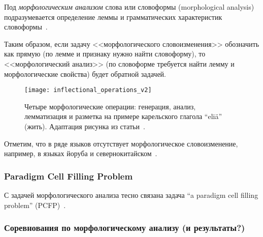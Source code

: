 Под \emph{морфологическим анализом} слова или словоформы (morphological analysis)
подразумевается определение леммы и
грамматических характеристик словоформы~\cite{MitreninaNikolaevLando2016}.

Таким образом, если задачу <<морфологического словоизменения>> обозначить как прямую
(по лемме и признаку нужно найти словоформу),
то <<морфологический анализ>> (по словоформе требуется найти
лемму и морфологические свойства) будет обратной задачей.

\begin{figure}
    \centering
    \texttt{[image: inflectional\_operations\_v2]}
\caption[Четыре морфологические операции: генерация, анализ, лемматизация и разметка]{Четыре морфологические операции: генерация, анализ, лемматизация и разметка 
		   на примере карельского глагола ``eliä'' (жить).  
              Адаптация рисунка из статьи~\cite{Nicolai2020FineGraned}.} \label{fig:inflectional_operations}
\end{figure}

Отметим, что в ряде языков отсутствует морфологическое словоизменение,
например, в языках йоруба и севернокитайском~\cite[2]{Vylomova2020Sigmorphon}.




\subsubsection{Paradigm Cell Filling Problem}

С задачей морфологического анализа тесно связана задача
``a paradigm cell filling problem'' (PCFP)~\cite{Ackerman08PartsAndWholes}.



\subsubsection{Соревнования по морфологическому анализу (и результаты?)}

